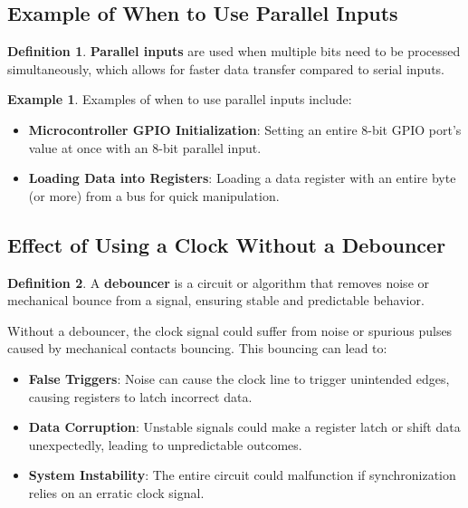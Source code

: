 \documentclass[12pt]{article}
\theoremstyle{definition}
\newtheorem{definition}{Definition}
\newtheorem{example}{Example}
\begin{document}
\subsection{Example of When to Use Parallel Inputs}

\begin{definition}
	\textbf{Parallel inputs} are used when multiple bits need to be processed simultaneously, which allows for faster data transfer compared to serial inputs.
\end{definition}

\begin{example}
	Examples of when to use parallel inputs include:
	\begin{itemize}
		\item \textbf{Microcontroller GPIO Initialization}: Setting an entire 8-bit GPIO port’s value at once with an 8-bit parallel input.
		\item \textbf{Loading Data into Registers}: Loading a data register with an entire byte (or more) from a bus for quick manipulation.
	\end{itemize}
\end{example}

\subsection*{Effect of Using a Clock Without a Debouncer}

\begin{definition}
	A \textbf{debouncer} is a circuit or algorithm that removes noise or mechanical bounce from a signal, ensuring stable and predictable behavior.
\end{definition}

Without a debouncer, the clock signal could suffer from noise or spurious pulses caused by mechanical contacts bouncing. This bouncing can lead to:
\begin{itemize}
	\item \textbf{False Triggers}: Noise can cause the clock line to trigger unintended edges, causing registers to latch incorrect data.
	\item \textbf{Data Corruption}: Unstable signals could make a register latch or shift data unexpectedly, leading to unpredictable outcomes.
	\item \textbf{System Instability}: The entire circuit could malfunction if synchronization relies on an erratic clock signal.
\end{itemize}
\end{document}
